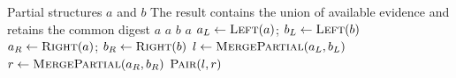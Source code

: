 \begin{algorithm}[htbp]
\caption{Merge Compatible Partial Structures}
\label{alg:merge-partial}
\begin{algorithmic}[1]
\Require Partial structures $a$ and $b$
\Ensure The result contains the union of available evidence and retains the common digest
    \State {}
  \EndIf
    \State \Return $a$
    \State \Return $a$
    \State \Return $b$
    \State \Return $a$
  \Else
    \State $a_L \gets \Call{Left}{a}$; $b_L \gets \Call{Left}{b}$
    \State $a_R \gets \Call{Right}{a}$; $b_R \gets \Call{Right}{b}$
    \State $l \gets \Call{MergePartial}{a_L,b_L}$
    \State $r \gets \Call{MergePartial}{a_R,b_R}$
    \State \Return $\Call{Pair}{l,r}$
  \EndIf
\EndFunction
\end{algorithmic}
\end{algorithm}
